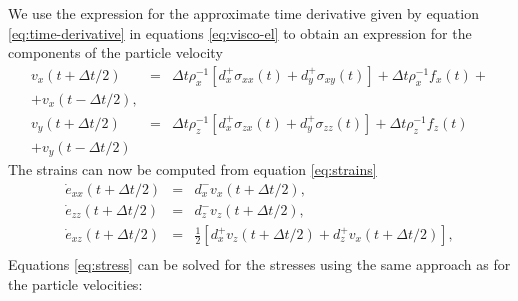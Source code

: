 \documentclass[11pt]{article}
\begin{document}
We use the expression for the approximate time derivative given by 
equation \eqref{eq:time-derivative}
in equations \eqref{eq:visco-el} to obtain an expression for the 
components of the particle velocity
\begin{eqnarray}
v_x(t+\Delta t/2) & = &  \Delta t\rho_x^{-1}\left[d^+_x \sigma_{xx}(t) 
                        +d^+_y \sigma_{xy}(t)\right] 
                        + \Delta t \rho_x^{-1}f_x(t) +            \nonumber\\ 
                        +v_x(t-\Delta t/2),\nonumber\\
v_y(t+\Delta t/2) & = &  \Delta t \rho_z^{-1}\left[d^+_x \sigma_{zx}(t) 
                        +d^+_y \sigma_{zz}(t)\right] 
                        +\Delta t \rho_z^{-1}f_z(t)\nonumber\\  
                        +v_y(t-\Delta t/2) 
                       \label{eq:vi-2d}
\end{eqnarray}
The strains can now be computed from equation \eqref{eq:strains}
\begin{eqnarray}
  \dot{e}_{xx}(t+\Delta t/2) & = & d^-_x v_x(t+\Delta t/2),     \nonumber  \\
  \dot{e}_{zz}(t+\Delta t/2) & = & d^-_z v_z(t+\Delta t/2),     \nonumber  \\
  \dot{e}_{xz}(t+\Delta t/2) & = & \frac{1}{2}\left[d^+_x v_z(t+\Delta t/2) 
                             + d^+_z v_x(t+\Delta t/2)\right], \nonumber   \\
                       \label{eq:strain2d}
\end{eqnarray}
%
Equations \eqref{eq:stress}   can be solved for the stresses using 
the same approach as for the particle velocities:
\end{document}
